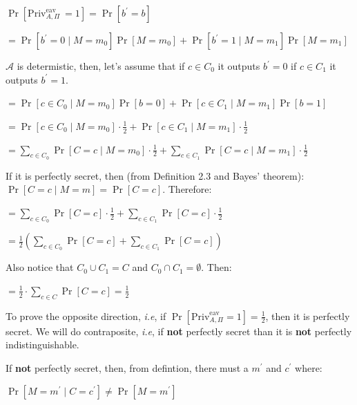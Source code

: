 \vspace{1em}

$\Pr[\text{Priv}^{\text{eav}}_{A, \Pi}\ = 1] = \Pr[b^\prime = b]$

$= \Pr[b^\prime = 0 \mid M = m_0]\Pr[M = m_0] + \Pr[b^\prime = 1 \mid M = m_1]\Pr[M = m_1]$

\vspace{1em}

$\mathcal{A}$ is determistic, then, let's assume that if $c \in C_0$  it outputs $b^\prime = 0$ if $c \in C_1$  it outputs $b^\prime = 1$.

$= \Pr[c \in C_0 \mid M = m_0]\Pr[b = 0] + \Pr[c \in C_1 \mid M = m_1]\Pr[b = 1]$

$= \Pr[c \in C_0 \mid M = m_0]\cdot\frac{1}{2} + \Pr[c \in C_1 \mid M = m_1]\cdot\frac{1}{2}$

$=  \sum_{c \in C_0} \Pr[C = c \mid M = m_0]\cdot\frac{1}{2} +  \sum_{c \in C_1} \Pr[C = c \mid M = m_1]\cdot\frac{1}{2}$

\vspace{1em}

If it is perfectly secret, then (from Definition 2.3 and Bayes' theorem):  $\Pr[C = c \mid M = m] = \Pr[C = c]$. Therefore:

\vspace{1em}

$=  \sum_{c \in C_0} \Pr[C = c]\cdot\frac{1}{2} +  \sum_{c \in C_1} \Pr[C = c]\cdot\frac{1}{2}$

$= \frac{1}{2} ( \sum_{c \in C_0} \Pr[C = c] +  \sum_{c \in C_1} \Pr[C = c] )$

\vspace{1em}

Also notice that $C_0 \cup C_1 = C$ and $C_0 \cap C_1 = \emptyset$. Then:

\vspace{1em}

$= \frac{1}{2}  \cdot \sum_{c \in C} \Pr[C = c] = \frac{1}{2}$

\vspace{1em}

To prove the opposite direction, \textit{i.e}, if $\Pr[\text{Priv}^{\text{eav}}_{A, \Pi} = 1] = \frac{1}{2}$, then it is perfectly secret. We will do contraposite, \textit{i.e}, if \textbf{not} perfectly secret than it is \textbf{not} perfectly indistinguishable.

If \textbf{not} perfectly secret, then, from defintion, there must a $m^\prime$ and $c^\prime$ where:

$\Pr[M = m^\prime \mid C = c^\prime] \ne \Pr[M = m^\prime]$

